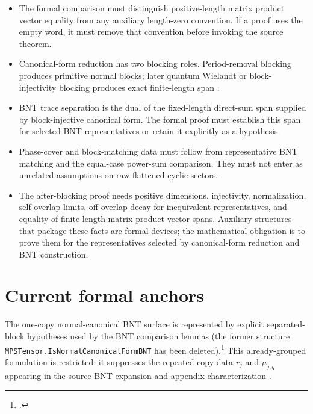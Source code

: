 \documentclass{article}
\begin{document}
\begin{itemize}
    \item The formal comparison must distinguish positive-length matrix product
    vector equality from any auxiliary length-zero convention. If a proof uses
    the empty word, it must remove that convention before invoking the source
    theorem.

    \item Canonical-form reduction has two blocking roles. Period-removal
    blocking produces primitive normal blocks; later quantum Wielandt or
    block-injectivity blocking produces exact finite-length span
    \cite{Sanz2010Quantum}.

    \item BNT trace separation is the dual of the fixed-length direct-sum span
    supplied by block-injective canonical form. The formal proof must establish
    this span for selected BNT representatives or retain it explicitly as a
    hypothesis.

    \item Phase-cover and block-matching data must follow from representative
    BNT matching and the equal-case power-sum comparison. They must not enter
    as unrelated assumptions on raw flattened cyclic sectors.

    \item The after-blocking proof needs positive dimensions, injectivity,
    normalization, self-overlap limits, off-overlap decay for inequivalent
    representatives, and equality of finite-length matrix product vector spans.
    Auxiliary structures that package these facts are formal devices; the
    mathematical obligation is to prove them for the representatives selected
    by canonical-form reduction and BNT construction.
\end{itemize}

\section{Current formal anchors}

The one-copy normal-canonical BNT surface is represented by explicit
separated-block hypotheses used by the BNT comparison lemmas (the former
structure \texttt{MPSTensor.IsNormalCanonicalFormBNT} has been deleted).\footnote{%
.}
This already-grouped formulation is restricted: it suppresses the repeated-copy
data $r_j$ and $\mu_{j,q}$ appearing in the source BNT expansion and appendix
characterization \cite{Cirac2016MPDO_arXiv}.
\end{document}
